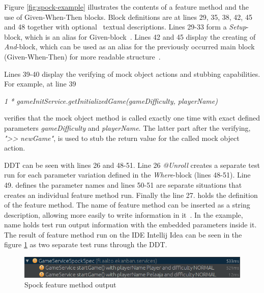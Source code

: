     Figure \ref{fig:spock-example} illustrates the contents of a feature method and the use of Given-When-Then blocks.
    Block definitions are at lines 29, 35, 38, 42, 45 and 48 together
    with optional~\cite{spock} textual descriptions.
    Lines 29-33 form a \textit{Setup}-block, which is an alias for Given-block~\cite{spock}.
    Lines 42 and 45 display the creating of \textit{And}-block, which can be used as
    an alias for the previously occurred main block (Given-When-Then) for more readable structure~\cite{kapelonis2016java}.

    Lines 39-40 display the verifying of mock object actions and stubbing capabilities.
    For example, at line 39
    \begin{center}
    \textit{1 * gameInitService.getInitializedGame(gameDifficulty, playerName)}
    \end{center}
    verifies that the mock object method is called exactly one time with exact defined parameters \textit{gameDifficulty} and \textit{playerName}.
    The latter part after the verifying, \textit{"\textgreater\textgreater} \textit{newGame"}, is used to stub the return value for the
    called mock object action.

    DDT can be seen with lines 26 and 48-51.
    Line 26 \textit{@Unroll} creates a separate test run for each parameter
    variation defined in the \textit{Where}-block (lines 48-51). Line 49. defines the parameter names and lines 50-51 are
    separate situations that creates an individual feature method run. Finally the line 27. holds the definition of
    the feature method. The name of feature method can be inserted as a string description, allowing more easily to write
    information in it~\cite{kapelonis2016java}. In the example, name holds test run output information with the embedded parameters inside it.
    The result of feature method run on the IDE Intellij Idea can be seen in the figure \ref{fig:spock-result} as two separate test runs through the DDT.
    \begin{figure}[ht]
      \begin{center}
        \includegraphics[width=12.5cm]{images/spock-result.png}
        \caption{Spock feature method output}
        \label{fig:spock-result}
      \end{center}
    \end{figure}

